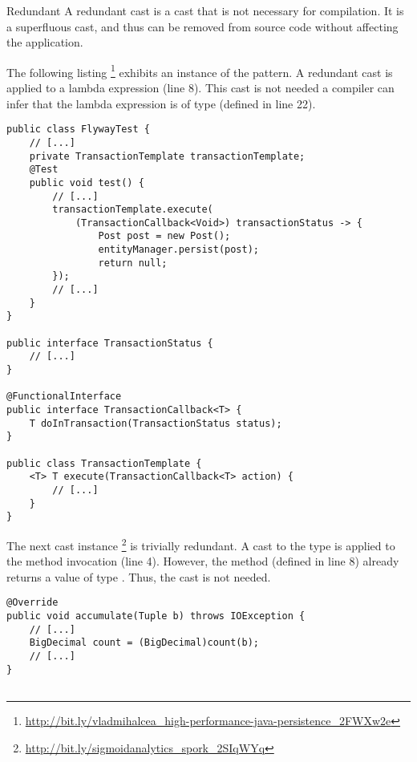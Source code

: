 \begin{pattern}{Redundant}
A redundant cast is a cast that is not necessary for compilation.
It is a superfluous cast,
and thus can be removed from source code without affecting the application.

\instances{}
%
The following listing%
\footnote{\url{http://bit.ly/vladmihalcea_high-performance-java-persistence_2FWXw2e}}
exhibits an instance of the \thisp{} pattern.
A redundant cast is applied to a lambda expression (line 8).
This cast is not needed a \java{} compiler can infer that the lambda expression is of type  (defined in line 22).

\begin{verbatim}
public class FlywayTest {
    // [...]
    private TransactionTemplate transactionTemplate;
    @Test
    public void test() {
        // [...]
        transactionTemplate.execute(
            (TransactionCallback<Void>) transactionStatus -> {
                Post post = new Post();
                entityManager.persist(post);
                return null;
        });
        // [...]
    }
}

public interface TransactionStatus {
    // [...]
}

@FunctionalInterface
public interface TransactionCallback<T> {	
	T doInTransaction(TransactionStatus status);
}

public class TransactionTemplate {
	<T> T execute(TransactionCallback<T> action) {
        // [...]
	}
}
\end{verbatim}

The next cast instance%
\footnote{\url{http://bit.ly/sigmoidanalytics_spork_2SIqWYq}}
is trivially redundant.
A cast to the  type is applied to the method invocation  (line 4).
However, the  method (defined in line 8) already returns a value of type .
Thus, the cast is not needed.

\begin{verbatim}
@Override
public void accumulate(Tuple b) throws IOException {
    // [...]
    BigDecimal count = (BigDecimal)count(b);
    // [...]
}


\end{verbatim}
\end{pattern}
